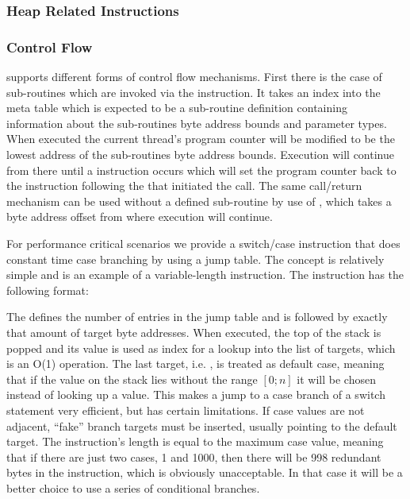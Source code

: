 \subsubsection{Heap Related Instructions}


\subsubsection{Control Flow}

\thename{} supports different forms of control flow mechanisms. First there is
the case of sub-routines which are invoked via the  instruction. It
takes an index into the meta table which is expected to be a sub-routine
definition containing information about the sub-routines byte address bounds and
parameter types. When executed the current thread's program counter will be
modified to be the lowest address of the sub-routines byte address
bounds. Execution will continue from there until a  instruction
occurs which will set the program counter back to the instruction following the
 that initiated the call. The same call/return mechanism can be
used without a defined sub-routine by use of , which takes a byte
address offset from where execution will continue.

For performance critical scenarios we provide a switch/case instruction that
does constant time case branching by using a jump table. The concept is
relatively simple and is an example of a variable-length instruction. The
 instruction has the following format:


The  defines the number of entries in the jump table and is
followed by exactly that amount of target byte addresses. When executed, the top
of the stack is popped and its value is used as index for a lookup into the list
of targets, which is an O(1) operation. The last target, i.e. ,
is treated as default case, meaning that if the value on the stack lies without
the range $[0;n]$ it will be chosen instead of looking up a value. This makes a
jump to a case branch of a switch statement very efficient, but has certain
limitations. If case values are not adjacent, ``fake'' branch targets must be
inserted, usually pointing to the default target. The instruction's length is
equal to the maximum case value, meaning that if there are just two cases, 1 and
1000, then there will be 998 redundant bytes in the instruction, which is
obviously unacceptable. In that case it will be a better choice to use a series
of conditional branches.



